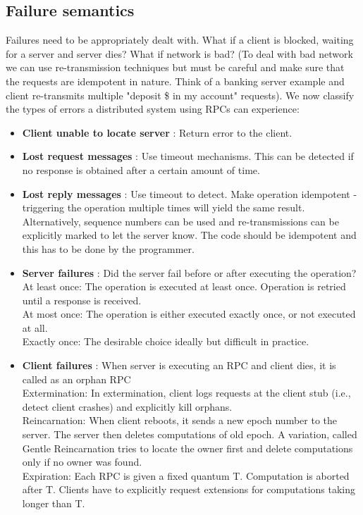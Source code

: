 \documentclass[twoside]{article}
\begin{document}
\subsection{Failure semantics}
Failures need to be appropriately dealt with. What if a client is blocked, waiting for a server and server dies? What if network is bad? (To deal with bad network we can use re-transmission techniques but must be careful and make sure that the requests are idempotent in nature. Think of a banking server example and client re-transmits multiple "deposit \$ in my account" requests). We now classify the types of errors a distributed system using RPCs can experience:
\begin{itemize}
  \item \textbf{{Client unable to locate server }} : Return error to the client.
  \item \textbf{{Lost request messages}} : Use timeout mechanisms. This can be detected if no response is obtained after a certain amount of time.
  \item \textbf{{Lost reply messages}} : Use timeout to detect. Make operation idempotent - triggering the operation multiple times will yield the same result. Alternatively, sequence numbers can be used and re-transmissions can be explicitly marked to let the server know. The code should be idempotent and this has to be done by the programmer.
  \item \textbf{{Server failures}} : Did the server fail before or after executing the operation?\\ At least once: The operation is executed at least once. Operation is retried until a response is received.\\ At most once: The operation is either executed exactly once, or not executed at all. \\Exactly once: The desirable choice ideally but difficult in practice.

  \item \textbf{{Client failures}} : When server is executing an RPC and client dies, it is called as an orphan RPC\\
    Extermination: In extermination, client logs requests at the client stub (i.e., detect client crashes) and explicitly kill orphans.\\
    Reincarnation: When client reboots, it sends a new epoch number to the server. The server then deletes computations of old epoch. A variation, called Gentle Reincarnation tries to locate the owner first and delete computations only if no owner was found.\\
    Expiration: Each RPC is given a fixed quantum T. Computation is aborted after T. Clients have to explicitly request extensions for computations taking longer than T.
\end{itemize}
\end{document}
